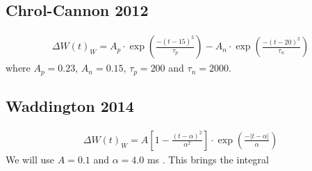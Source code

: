 \subsection{Chrol-Cannon 2012}
\begin{align}
\Delta W(t)_W = A_{p} \cdot \exp \left(\frac{-\left(t - 15 \right)^{2}}{ \tau_{p}}\right) - A_{n} \cdot \exp \left(\frac{-\left(t - 20\right)^{2}}{ \tau_{n}}\right)  \label{eq:learningwindowChrolCannon2012}
\end{align}
where $A_{p}=0.23$, $A_{n}=0.15$, $\tau_{p}=200$ and $\tau_n = 2000$.

\subsection{Waddington 2014}
\begin{align}
\Delta W(t)_W =  A \left[1-\frac{\left(t-\alpha\right)^{2}}{\alpha^{2}}\right] \cdot \exp \left(\frac{-\left|t - \alpha\right|}{\alpha}\right) \label{eq:learningwindowWaddington2014}
\end{align}
We will use $A = 0.1$ and $\alpha = 4.0$ ms . This brings the integral 



\small{}

\label{LastPage}~


